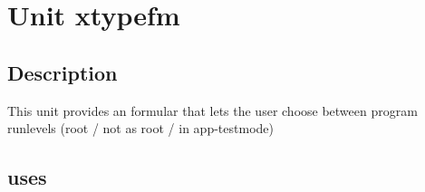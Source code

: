 \documentclass{report}
\begin{document}
\chapter{Unit xtypefm}
\label{xtypefm}
\section{Description}
This unit provides an formular that lets the user choose between program runlevels (root / not as root / in app{-}testmode)
\section{uses}
\end{document}
